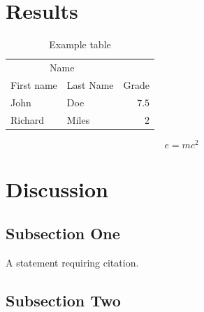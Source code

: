 \documentclass[twoside,twocolumn, elsart]{article}
\begin{document}
\section{Results}

\begin{table}
\caption{Example table}
\centering
\begin{tabular}{llr}
\toprule
\multicolumn{2}{c}{Name} \\
\cmidrule(r){1-2}
First name & Last Name & Grade \\
\midrule
John & Doe & $7.5$ \\
Richard & Miles & $2$ \\
\bottomrule
\end{tabular}
\end{table}

\blindtext %

\begin{equation}
\label{eq:emc}
e = mc^2
\end{equation}

\blindtext %


\section{Discussion}

\subsection{Subsection One}

A statement requiring citation.
\blindtext %

\subsection{Subsection Two}

\blindtext %

\end{document}
